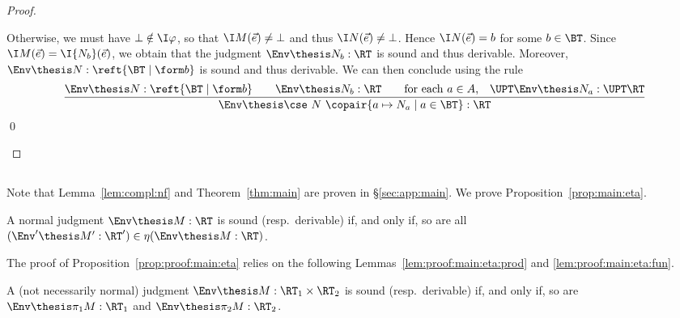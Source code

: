 \begin{proof}
\begin{description}
Otherwise, we must have $\bot \notin \I\varphi$,
so that $\I M(\vec e) \neq \bot$
and thus $\I N(\vec e) \neq \bot$.
Hence $\I N(\vec e) = b$ for some $b \in \BT$.
Since $\I M(\vec e) = \I{N_b}(\vec e)$,
we obtain that the judgment
$\Env \thesis N_b : \RT$ is sound and thus derivable.
Moreover,
$\Env \thesis N : \reft{\BT \mid \form b}$ is sound and thus
derivable.
We can then conclude using the rule
\[
\dfrac{
  \Env \thesis N : \reft{\BT \mid \form b}
  \qquad
  \Env \thesis N_b : \RT
  \qquad
  \text{for each $a \in A$,\quad} \UPT\Env \thesis N_a : \UPT\RT}
  {\Env \thesis \cse\ N\ \copair{a \mapsto N_a \mid a \in \BT} : \RT}
\]
\qed
\end{description}
\end{proof}







\subsection{}
\label{sec:proof:main}

Note that Lemma~\ref{lem:compl:nf} and Theorem~\ref{thm:main}
are proven in \S\ref{sec:app:main}.
We prove Proposition~\ref{prop:main:eta}.

\begin{proposition}
\label{prop:proof:main:eta}
A normal judgment $\Env \thesis M : \RT$ is sound (resp.\ derivable)
if, and only if, so are all $(\Env' \thesis M' : \RT') \in \eta(\Env \thesis M : \RT)$.
\end{proposition}

The proof of Proposition~\ref{prop:proof:main:eta}
relies on the following
Lemmas~\ref{lem:proof:main:eta:prod} and \ref{lem:proof:main:eta:fun}.

\begin{lemma}
\label{lem:proof:main:eta:prod}
A (not necessarily normal) judgment
$\Env \thesis M : \RT_1 \times \RT_2$
is sound (resp.\ derivable)
if, and only if,
so are $\Env \thesis \pi_1 M : \RT_1$
and $\Env \thesis \pi_2 M : \RT_2$.
\end{lemma}


